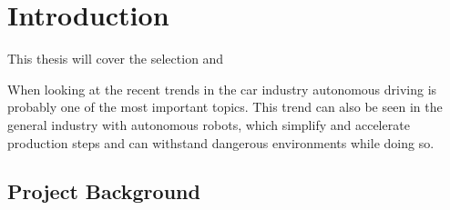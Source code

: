 \chapter{Introduction}
\label{introduction}

This thesis will cover the selection and 


When looking at the recent trends in the car industry autonomous driving is probably one of the most important topics. This trend can also be seen in the general industry with autonomous robots, which simplify and accelerate production steps and can withstand dangerous environments while doing so.\\




\section{Project Background}

